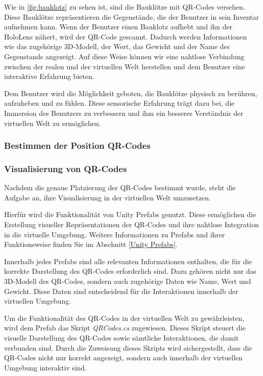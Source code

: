 Wie in \ref{fig:bauklotz} zu sehen ist, sind die Bauklötze mit QR-Codes versehen. Diese Bauklötze repräsentieren die Gegenstände,
die der Benutzer in sein Inventar aufnehmen kann. Wenn der Benutzer einen Bauklotz aufhebt und ihn der HoloLens nähert, wird
der QR-Code gescannt. Dadurch werden Informationen wie das zugehörige 3D-Modell, der Wert, das Gewicht und der Name des
Gegenstands angezeigt. Auf diese Weise können wir eine nahtlose Verbindung zwischen der realen und der virtuellen Welt
herstellen und dem Benutzer eine interaktive Erfahrung bieten.

Dem Benutzer wird die Möglichkeit geboten, die Bauklötze physisch zu berühren, aufzuheben und zu fühlen. Diese sensorische
Erfahrung trägt dazu bei, die Immersion des Benutzers zu verbessern und ihm ein besseres Verständnis der virtuellen Welt
zu ermöglichen.

\subsubsection{Bestimmen der Position QR-Codes}

\subsubsection{Visualisierung von QR-Codes}
Nachdem die genaue Platzierung der QR-Codes bestimmt wurde, steht die Aufgabe an, ihre Visualisierung in der virtuellen Welt umzusetzen.

Hierfür wird die Funktionalität von Unity Prefabs genutzt. Diese ermöglichen die Erstellung visueller Repräsentationen
der QR-Codes und ihre nahtlose Integration in die virtuelle Umgebung. Weitere Informationen zu Prefabs und ihrer Funktionsweise
finden Sie im Abschnitt \ref{Unity Prefabs}.

Innerhalb jedes Prefabs sind alle relevanten Informationen enthalten, die für die korrekte Darstellung des QR-Codes
erforderlich sind. Dazu gehören nicht nur das 3D-Modell des QR-Codes, sondern auch zugehörige Daten wie Name, Wert und
Gewicht. Diese Daten sind entscheidend für die Interaktionen innerhalb der virtuellen Umgebung.

Um die Funktionalität des QR-Codes in der virtuellen Welt zu gewährleisten, wird dem Prefab das Skript \textit{QRCodes.cs} zugewiesen.
Dieses Skript steuert die visuelle Darstellung des QR-Codes sowie sämtliche Interaktionen, die damit verbunden sind. Durch
die Zuweisung dieses Skripts wird sichergestellt, dass die QR-Codes nicht nur korrekt angezeigt, sondern auch innerhalb
der virtuellen Umgebung interaktiv sind.

